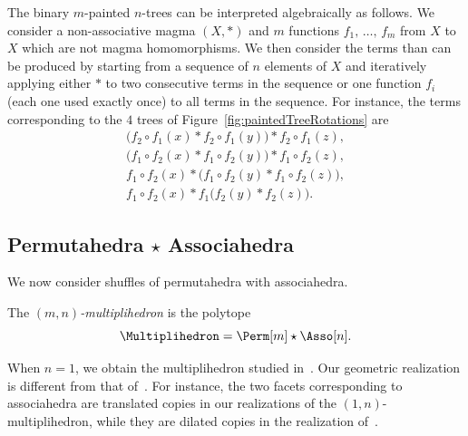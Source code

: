 \documentclass[AHL,Unicode,longabstracts,published]{cedram}
\newcommand{\shuffleDP}{\star} %
\begin{document}
\begin{rema}\label{rem:algebraicInterpretationMultiplihedra}
The binary $m$-painted $n$-trees can be interpreted algebraically as follows. We consider a non-associative magma $(X, \ast)$ and $m$ functions $f_1,\, \dots,\, f_m$ from $X$ to $X$ which are not magma homomorphisms. We then consider the terms than can be produced by starting from a sequence of $n$ elements of $X$ and iteratively applying either $\ast$ to two consecutive terms in the sequence or one function $f_i$ (each one used exactly once) to all terms in the sequence. For instance, the terms corresponding to the $4$ trees of Figure~\ref{fig:paintedTreeRotations} are
\begin{gather*}
\big(f_2 \circ f_1(x) \ast f_2 \circ f_1(y) \big) \ast f_2 \circ f_1(z), \\
\big(f_1 \circ f_2(x) \ast f_1 \circ f_2(y) \big) \ast f_1 \circ f_2(z), \\
f_1 \circ f_2(x) \ast \big(f_1 \circ f_2(y) \ast f_1 \circ f_2(z) \big), \\
f_1 \circ f_2(x) \ast f_1 \big(f_2(y) \ast f_2(z) \big).
\end{gather*}
\end{rema}



\subsection{Permutahedra \texorpdfstring{$\shuffleDP$}{shuffleDP} Associahedra}\label{subsec:multiplihedra}

We now consider shuffles of permutahedra with associahedra.

\begin{defi}\label{def:multiplihedron}
The
\emph{$(m,n)$-multiplihedron} is the polytope
\[
\Multiplihedron = \Perm[m] \shuffleDP \Asso[n].
\]
\end{defi}

\begin{rema}\label{rem:multipliheadra}
When $n = 1$, we obtain the multiplihedron studied in~\cite{ArdilaDoker,Forcey-multiplihedra, ForceyLauveSottile, MauWoodward, Stasheff-HSpaces, SaneblidzeUmble-diagonals}. Our geometric realization is different from that of~\cite{Forcey-multiplihedra}. For instance, the two facets corresponding to associahedra are translated copies in our realizations of the $(1,n)$-multiplihedron, while they are dilated copies in the realization of~\cite{Forcey-multiplihedra}.
\end{rema}
\end{document}
